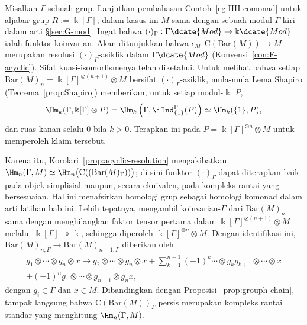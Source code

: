 \begin{example}\label{eg:group-H-comonad}
	Misalkan $\Gamma$ sebuah grup. Lanjutkan pembahasan
	Contoh~\ref{eg:HH-comonad} untuk aljabar grup $R:=\Bbbk[\Gamma]$; dalam
	kasus ini $M$ sama dengan sebuah modul-$\Gamma$ kiri dalam arti
	\S\ref{sec:G-mod}. Ingat bahwa
	$(\mathord\cdot)_{\Gamma}:\Gamma\dcate{Mod}\to\Bbbk\dcate{Mod}$ ialah
	funktor koinvarian. Akan ditunjukkan bahwa
	$\epsilon_M:\mathrm{C}(\mathrm{Bar}(M))\to M$ merupakan resolusi
	$(\mathord\cdot)_{\Gamma}$-asiklik dalam $\Gamma\dcate{Mod}$
	(Konvensi~\ref{con:F-acyclic}). Sifat kuasi-isomorfismenya telah
	diketahui. Untuk melihat bahwa setiap
	$\mathrm{Bar}(M)_n=\Bbbk[\Gamma]^{\otimes(n+1)}\otimes M$ bersifat
	$(\mathord\cdot)_{\Gamma}$-asiklik, mula-mula Lema Shapiro
	(Teorema~\ref{prop:Shapiro}) memberikan, untuk setiap modul-$\Bbbk$ $P$,
	\[ \Hm_k(\Gamma, \Bbbk[\Gamma] \otimes P ) = \Hm_k\left( \Gamma, \iInd^{\Gamma}_{\{1\}}(P) \right) \simeq \Hm_k(\{1\}, P), \]
	dan ruas kanan selalu $0$ bila $k>0$. Terapkan ini pada
	$P=\Bbbk[\Gamma]^{\otimes n}\otimes M$ untuk memperoleh klaim tersebut.

	Karena itu, Korolari~\ref{prop:acyclic-resolution} mengakibatkan
	$\Hm_n(\Gamma,M)\simeq
	\Hm_n\bigl(\mathrm{C}((\mathrm{Bar}(M)_{\Gamma}))\bigr)$; di sini
	funktor $(\mathord\cdot)_{\Gamma}$ dapat diterapkan baik pada objek
	simplisial maupun, secara ekuivalen, pada kompleks rantai yang
	bersesuaian. Hal ini menafsirkan homologi grup sebagai homologi komonad
	dalam arti latihan bab ini. Lebih tepatnya, mengambil koinvarian-$\Gamma$
	dari $\mathrm{Bar}(M)_n$ sama dengan menghilangkan faktor tensor
	pertama dalam $\Bbbk[\Gamma]^{\otimes(n+1)}\otimes M$ melalui
	$\Bbbk[\Gamma]\twoheadrightarrow\Bbbk$, sehingga diperoleh
	$\Bbbk[\Gamma]^{\otimes n}\otimes M$. Dengan identifikasi ini,
	$\mathrm{Bar}(M)_{n,\Gamma}\to\mathrm{Bar}(M)_{n-1,\Gamma}$ diberikan
	oleh
	\begin{multline*}
		g_1 \otimes \cdots \otimes g_n \otimes x \mapsto g_2 \otimes \cdots \otimes g_n \otimes x + \sum_{k=1}^{n-1} (-1)^k \cdots \otimes g_k g_{k+1} \otimes \cdots \otimes x \\
		+ (-1)^n g_1 \otimes \cdots \otimes g_{n-1} \otimes g_n x,
	\end{multline*}
	dengan $g_i\in\Gamma$ dan $x\in M$. Dibandingkan dengan
	Proposisi~\ref{prop:grouph-chain}, tampak langsung bahwa
	$\mathrm{C}(\mathrm{Bar}(M))_{\Gamma}$ persis merupakan kompleks rantai standar
	yang menghitung $\Hm_n(\Gamma,M)$.
\end{example}

